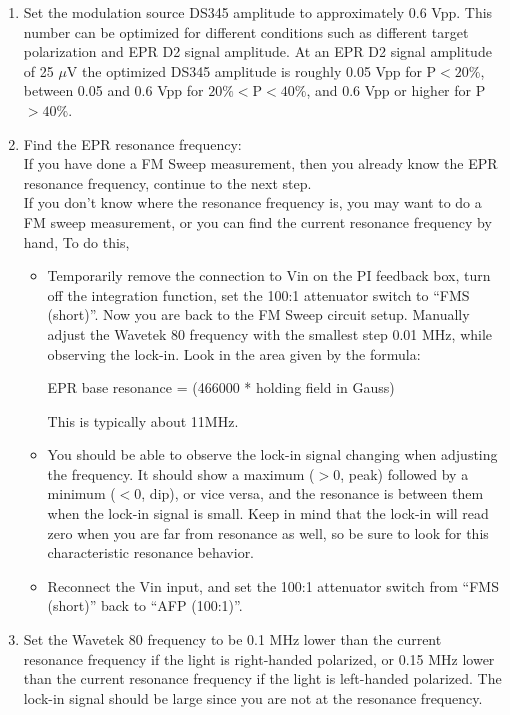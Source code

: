 \begin{enumerate}

\item Set the modulation source DS345 amplitude to approximately 0.6 Vpp.  
This number can be optimized for different conditions such as different 
target polarization and EPR D2 signal amplitude.  At an EPR D2 signal amplitude
of 25 $\mu$V the optimized DS345 amplitude is roughly 0.05 Vpp for P$< 20\%$, 
between 0.05 and 0.6 Vpp for $20\%<$P$<40\%$, and 0.6 Vpp or higher for 
P$> 40\% $.

\item Find the EPR resonance frequency:\\

If you have done a FM Sweep measurement, then you already know the
EPR resonance frequency, continue to the next step.\\

If you don't know where the resonance frequency is, you may want to do 
a FM sweep measurement, or you can 
find the current resonance frequency by hand,
To do this, 
\begin{itemize}
\item Temporarily remove the
connection to Vin on the PI feedback box, turn off the integration
function, set the 100:1 attenuator switch to ``FMS (short)''.  Now you are back to the FM Sweep circuit setup.
Manually adjust the Wavetek 80
frequency with the smallest step 0.01 MHz, 
while observing the lock-in.  Look in the area
given by the formula:                                                                                       

EPR base resonance = (466000 * holding field in Gauss) 

This is typically about 11MHz.

\item You should be able to observe the lock-in signal changing 
when adjusting the frequency.  It should show a maximum ($>$0, peak) followed
by a minimum ($<$0, dip), or vice versa, and the resonance is between them
when the lock-in signal is small.  Keep in mind that the lock-in will
read zero when you are far from resonance
as well, so be sure to look for this characteristic resonance behavior. 

\item Reconnect the Vin input, and
set the 100:1 attenuator switch from ``FMS (short)'' back to ``AFP (100:1)''.   
\end{itemize}

\item Set the Wavetek 80 frequency
to be 0.1 MHz lower than the current resonance frequency if the light is
right-handed polarized, or 0.15 MHz lower than the current resonance frequency 
if the light is left-handed polarized.
The lock-in signal should be large since you are not at the resonance frequency.


\end{enumerate}
